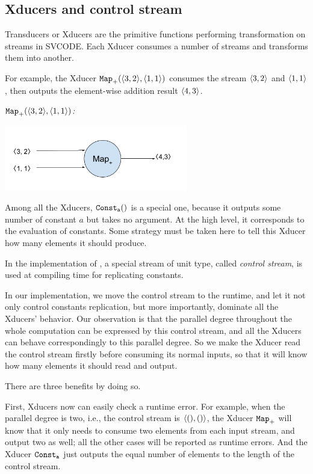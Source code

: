 \subsection{Xducers and control stream}

Transducers or Xducers are the primitive functions performing transformation on streams in SVCODE. 
Each Xducer consumes a number of streams and transforms them into another. 

For example, the Xducer $\map{+}(\<3,2\'>, \< 1,1\'>)$ consumes the stream $\<3,2\'>$ and $\< 1,1\'>$, then outputs 
the element-wise addition result $\<4, 3\'>$. 

\begin{example} \emph{$\map{+}(\<3,2\'>, \< 1,1\'>)$:}\\
	\begin{center}
		\includegraphics[width=0.6\textwidth]{fig/mapxducer.png}
	\end{center}
\end{example}


Among all the Xducers, $\mathtt{Const_{a}()}$ is a special one, because it outputs some number of constant $a$ but takes no argument.  
At the high level, it corresponds to the evaluation of constants.
Some strategy must be taken here to tell this Xducer how many elements it should produce.

In the implementation of \cite{MF16}, a special stream of unit type, called \emph{control stream}, is used at compiling time for replicating constants.

In our implementation, we move the control stream to the runtime, and let it not only control constants replication, but more importantly, dominate all the Xducers' behavior. 
Our observation is that the parallel degree throughout the whole computation can be expressed by this control stream, and all the Xducers can behave correspondingly to this parallel degree. 
So we make the Xducer read the control stream firstly before consuming its normal inputs, so that it will know how many elements it should read and output.

There are three benefits by doing so.

First, Xducers now can easily check a runtime error. 
For example, when the parallel degree is two, i.e., the control stream is $\< (),() \'>$, the Xducer $\mathtt{Map}_{+}$ will know that it only needs to consume two elements from each input stream, and output two as well; all the other cases will be reported as runtime errors.  
And the Xducer $\mathtt{Const_{a}}$ just outputs the equal number of elements to the length of the control stream.


